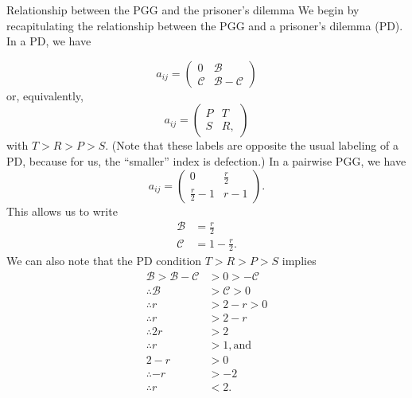 \documentclass[13pt]{amsart}
\newcommand{\B}{\mathcal{B}}
\newcommand{\C}{\mathcal{C}}
\begin{document}
\begin{section}{Relationship between the PGG and the prisoner's dilemma}
We begin by recapitulating the relationship between the PGG and a prisoner's dilemma (PD).
In a PD, we have
\end{section}\begin{equation}
    a_{ij} =
    \begin{pmatrix}
        0 & \B \\
        \C & \B - \C
    \end{pmatrix}
\end{equation}
or, equivalently,
\begin{equation}
    a_{ij} =
    \begin{pmatrix}
        P & T \\
        S & R,
    \end{pmatrix}
\end{equation}
with $T > R > P > S$.
(Note that these labels are opposite the usual labeling of a PD, because for us, the ``smaller'' index is defection.)
In a pairwise PGG, we have
\begin{equation}
    a_{ij} =
    \begin{pmatrix}
        0 & \frac{r}{2} \\
        \frac{r}{2} - 1 & r - 1
    \end{pmatrix}.
\end{equation}
This allows us to write
\begin{equation}
    \begin{split}
        \mathcal{B} & = \frac{r}{2}\\
        \mathcal{C} & = 1 - \frac{r}{2}.
    \end{split}
\end{equation}
We can also note that the PD condition $T > R > P > S$ implies
\begin{equation}
    \begin{split}
        \mathcal{B} > \mathcal{B} - \mathcal{C} & > 0 > -\mathcal{C} \\
        \therefore \mathcal{B} & > \mathcal{C} > 0 \\
        \therefore r & > 2 - r > 0 \\
        \therefore r & > 2 - r \\
        \therefore 2r & > 2 \\
        \therefore r & > 1, \text{and}\\
        2 - r & > 0\\
        \therefore -r & > -2\\
        \therefore r & < 2.
    \end{split}
\end{equation}
\end{document}
